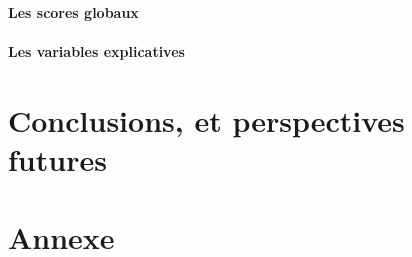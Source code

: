 \documentclass[12pt,a4paper,oneside,titlepage]{book} %
\begin{document}
\subsection{Les scores globaux}


\subsection{Les variables explicatives}

\part{Conclusions, et perspectives futures}
	
	\pagebreak


	\part{Annexe}
\end{document}
